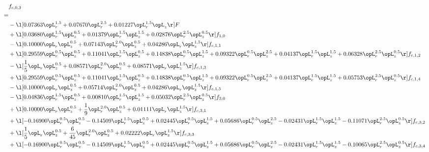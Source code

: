 \begin{alignat}{2} 
\label{eq:f_03_1} 
& f_{c,0,3} \nonumber \\ 
 = \\ 
& - \l[  0.07363 \opL_r^{1.5} +  0.07670 \opL_r^{2.5} +  0.01227 \opL_r^{1.5} \opL_z  \r] F \nonumber \\ 
& + \l[  0.03680 \opL_r^{1.5} \opL_z^{0.5} +  0.01379 \opL_r^{1.5} \opL_z^{1.5} +  0.02876 \opL_r^{2.5} \opL_z^{0.5}  \r] f_{1,0} \nonumber \\ 
& - \l[  0.10000 \opL_r \opL_z^{0.5} +  0.07143 \opL_r^{2.0} \opL_z^{0.5} +  0.04286 \opL_r \opL_z^{1.5}  \r] f_{c,1,1} \nonumber \\ 
& + \l[  0.29559 \opL_r^{0.5} \opL_z^{0.5} +  0.11041 \opL_r^{1.5} \opL_z^{0.5} +  0.14838 \opL_r^{0.5} \opL_z^{1.5} +  0.09322 \opL_r^{0.5} \opL_z^{2.5} +  0.04137 \opL_r^{1.5} \opL_z^{1.5} +  0.06328 \opL_r^{2.5} \opL_z^{0.5}  \r] f_{c,1,2} \nonumber \\ 
& - \l[ \frac{1}{5} \opL_r \opL_z^{0.5} +  0.08571 \opL_r^{2.0} \opL_z^{0.5} +  0.08571 \opL_r \opL_z^{1.5}  \r] f_{c,1,3} \nonumber \\ 
& + \l[  0.29559 \opL_r^{0.5} \opL_z^{0.5} +  0.11041 \opL_r^{1.5} \opL_z^{0.5} +  0.14838 \opL_r^{0.5} \opL_z^{1.5} +  0.09322 \opL_r^{0.5} \opL_z^{2.5} +  0.04137 \opL_r^{1.5} \opL_z^{1.5} +  0.05753 \opL_r^{2.5} \opL_z^{0.5}  \r] f_{c,1,4} \nonumber \\ 
& - \l[  0.10000 \opL_r \opL_z^{0.5} +  0.05714 \opL_r^{2.0} \opL_z^{0.5} +  0.04286 \opL_r \opL_z^{1.5}  \r] f_{c,1,5} \nonumber \\ 
& - \l[  0.04836 \opL_r^{1.5} \opL_z^{0.5} +  0.00810 \opL_r^{1.5} \opL_z^{1.5} +  0.05032 \opL_r^{2.5} \opL_z^{0.5}  \r] f_{3,0} \nonumber \\ 
& + \l[  0.10000 \opL_r \opL_z^{0.5} + \frac{1}{9} \opL_r^{2.0} \opL_z^{0.5} +  0.01111 \opL_r \opL_z^{1.5}  \r] f_{c,3,1} \nonumber \\ 
& + \l[  -0.16900 \opL_r^{0.5} \opL_z^{0.5}   -0.14509 \opL_r^{1.5} \opL_z^{0.5} +  0.02445 \opL_r^{0.5} \opL_z^{1.5} +  0.05686 \opL_r^{0.5} \opL_z^{2.5}   -0.02431 \opL_r^{1.5} \opL_z^{1.5}   -0.11071 \opL_r^{2.5} \opL_z^{0.5}  \r] f_{c,3,2} \nonumber \\ 
& + \l[ \frac{1}{5} \opL_r \opL_z^{0.5} + \frac{6}{45} \opL_r^{2.0} \opL_z^{0.5} +  0.02222 \opL_r \opL_z^{1.5}  \r] f_{c,3,3} \nonumber \\ 
& + \l[  -0.16900 \opL_r^{0.5} \opL_z^{0.5}   -0.14509 \opL_r^{1.5} \opL_z^{0.5} +  0.02445 \opL_r^{0.5} \opL_z^{1.5} +  0.05686 \opL_r^{0.5} \opL_z^{2.5}   -0.02431 \opL_r^{1.5} \opL_z^{1.5}   -0.10065 \opL_r^{2.5} \opL_z^{0.5}  \r] f_{c,3,4} \nonumber \\ 

\end{alignat}
